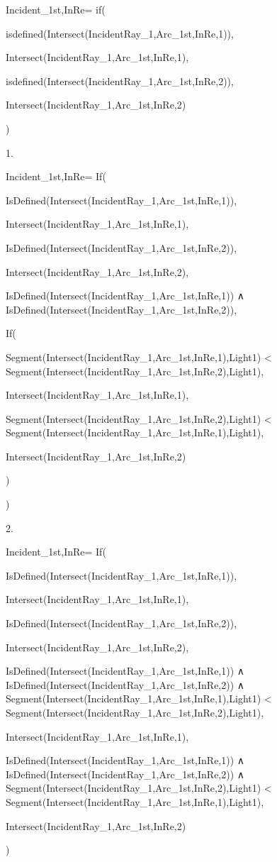 Incident_{1st,InRe}=
  if(

    isdefined(Intersect(IncidentRay_{1},Arc_{1st,InRe},1)),

    Intersect(IncidentRay_{1},Arc_{1st,InRe},1),

    isdefined(Intersect(IncidentRay_{1},Arc_{1st,InRe},2)),

    Intersect(IncidentRay_{1},Arc_{1st,InRe},2)
    
  )


1.

Incident_{1st,InRe}=
  If(

    IsDefined(Intersect(IncidentRay_{1},Arc_{1st,InRe},1)),
    
    Intersect(IncidentRay_{1},Arc_{1st,InRe},1),
    
    IsDefined(Intersect(IncidentRay_{1},Arc_{1st,InRe},2)),
    
    Intersect(IncidentRay_{1},Arc_{1st,InRe},2),
    
    IsDefined(Intersect(IncidentRay_{1},Arc_{1st,InRe},1)) ∧ IsDefined(Intersect(IncidentRay_{1},Arc_{1st,InRe},2)),

    If(

      Segment(Intersect(IncidentRay_{1},Arc_{1st,InRe},1),Light1) < Segment(Intersect(IncidentRay_{1},Arc_{1st,InRe},2),Light1),

      Intersect(IncidentRay_{1},Arc_{1st,InRe},1),

      Segment(Intersect(IncidentRay_{1},Arc_{1st,InRe},2),Light1) < Segment(Intersect(IncidentRay_{1},Arc_{1st,InRe},1),Light1),

      Intersect(IncidentRay_{1},Arc_{1st,InRe},2)

    )

  )


2.

Incident_{1st,InRe}=
  If(

    IsDefined(Intersect(IncidentRay_{1},Arc_{1st,InRe},1)),
    
    Intersect(IncidentRay_{1},Arc_{1st,InRe},1),
    
    IsDefined(Intersect(IncidentRay_{1},Arc_{1st,InRe},2)),
    
    Intersect(IncidentRay_{1},Arc_{1st,InRe},2),
    
    IsDefined(Intersect(IncidentRay_{1},Arc_{1st,InRe},1)) ∧ IsDefined(Intersect(IncidentRay_{1},Arc_{1st,InRe},2)) ∧ Segment(Intersect(IncidentRay_{1},Arc_{1st,InRe},1),Light1) < Segment(Intersect(IncidentRay_{1},Arc_{1st,InRe},2),Light1),

    Intersect(IncidentRay_{1},Arc_{1st,InRe},1),

    IsDefined(Intersect(IncidentRay_{1},Arc_{1st,InRe},1)) ∧ IsDefined(Intersect(IncidentRay_{1},Arc_{1st,InRe},2)) ∧ Segment(Intersect(IncidentRay_{1},Arc_{1st,InRe},2),Light1) < Segment(Intersect(IncidentRay_{1},Arc_{1st,InRe},1),Light1),

    Intersect(IncidentRay_{1},Arc_{1st,InRe},2)

  )
  
